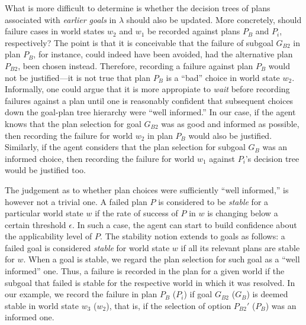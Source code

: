 What is more difficult to determine is whether the decision trees of plans
associated with \emph{earlier goals} in $\lambda$ should also be updated.
More concretely, should failure cases in world states $w_2$ and $w_1$ be recorded
against plans $P_B$ and $P_i$, respectively?
The point is that it is conceivable that the failure of subgoal $G_{B2}$ in plan
$P_B$, for instance, could indeed have been avoided, had the alternative plan
$P_{B2}$, been chosen instead. Therefore, recording a failure against plan $P_B$
would not be justified---it is not true that plan $P_{B}$ is a ``bad'' choice
in world state $w_2$.
Informally, one could argue that it is more appropiate to \emph{wait} before
recording failures against a plan until one is reasonably confident that
subsequent choices down the goal-plan tree hierarchy were ``well informed.'' In
our case, if the agent knows that the plan selection for goal $G_{B2}$ was as
good and informed as possible, then recording the failure for world $w_2$ in plan
$P_B$ would also be justified. Similarly, if the agent considers that the plan
selection for subgoal $G_B$ was an informed choice, then recording the failure
for world $w_1$ against $P_i$'s decision tree would be justified too.


\newcommand{\procedurefont}[1]{\mathsf{#1}}
\newcommand{\StableGoal}{\procedurefont{StableGoal}}
\newcommand{\RecordTrace}{\procedurefont{RecordFailedTrace}}
\newcommand{\RecordWorldDT}{\procedurefont{RecordWorldDT}}




The judgement as to whether plan choices were sufficiently ``well informed,'' is
however not a trivial one.  A failed plan $P$ is considered to be \emph{stable} for a
particular world state $w$ if the rate of success of $P$ in $w$ is changing below
a certain threshold $\epsilon$. In such a case, the agent can start to build
confidence about the applicability level of $P$. The stability notion extends to
goals as follows: a failed goal is considered \emph{stable} for world state $w$ 
if all its relevant plans are stable for $w$.
When a goal is stable, we regard the plan selection for such goal as a ``well
informed'' one. Thus, a failure is recorded in the plan for a given world if the subgoal that failed is stable for the respective world in which it was resolved. In our example, we
record the failure in plan $P_B$ ($P_i$) if goal $G_{B2}$ ($G_B$) is deemed stable
in world state $w_3$ ($w_2$), that is, if the selection of option $P_{B2}'$
($P_B$) was an informed one.



